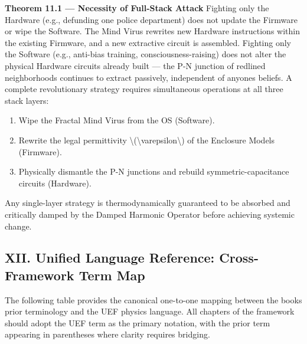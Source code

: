 {\textbf{Theorem 11.1 --- Necessity of Full-Stack Attack} Fighting only
the Hardware (e.g., defunding one police department) does not update the
Firmware or wipe the Software. The Mind Virus rewrites new Hardware
instructions within the existing Firmware, and a new extractive circuit
is assembled. Fighting only the Software (e.g., anti-bias training,
consciousness-raising) does not alter the physical Hardware circuits
already built --- the P-N junction of redlined neighborhoods continues
to extract passively, independent of anyone\textquotesingle s beliefs. A
complete revolutionary strategy requires simultaneous operations at all
three stack layers:

\begin{enumerate}
\tightlist
\item
  Wipe the Fractal Mind Virus from the OS (Software).
\item
  Rewrite the legal permittivity
  \textbackslash(\textbackslash varepsilon\textbackslash) of the
  Enclosure Models (Firmware).
\item
  Physically dismantle the P-N junctions and rebuild
  symmetric-capacitance circuits (Hardware).
\end{enumerate}

Any single-layer strategy is thermodynamically guaranteed to be absorbed
and critically damped by the Damped Harmonic Operator before achieving
systemic change.

\protect{}\label{sec-unifying-language}
\subsection{XII. Unified Language Reference: Cross-Framework Term
Map}\label{xii.-unified-language-reference-cross-framework-term-map}

The following table provides the canonical one-to-one mapping between
the book\textquotesingle s prior terminology and the UEF physics
language. All chapters of the framework should adopt the UEF term as the
primary notation, with the prior term appearing in parentheses where
clarity requires bridging.

}
